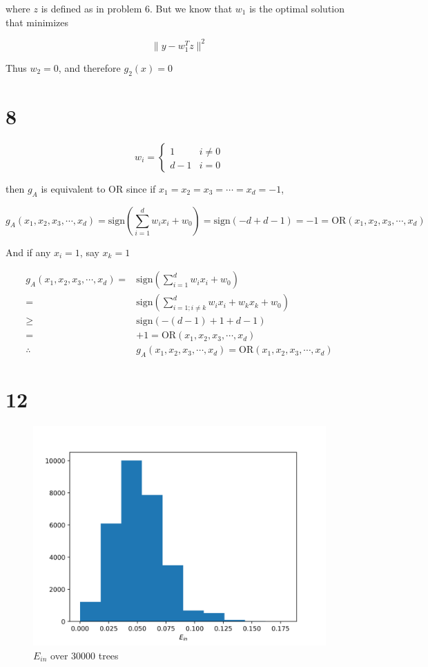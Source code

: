\documentclass[fleqn,a4paper,12pt]{article}
\begin{document}
where $z$ is defined as in problem 6. But we know that $w_1$ is the optimal solution that minimizes 

\begin{equation*}
  \lVert y - w_1^T z \rVert^2
\end{equation*}

Thus $w_2 = 0$, and therefore $g_2(x) = 0$

\section*{8}

\begin{equation*}
w_i =
\begin{cases}
  1 & i \ne 0 \\
  d - 1 & i = 0
\end{cases}
\end{equation*}

then $g_A$ is equivalent to OR since if $x_1 = x_2 = x_3 = \cdots = x_d = -1$,

\begin{equation*}
  g_A(x_1, x_2, x_3, \cdots, x_d) = \mathrm{sign}(\sum_{i=1}^d w_i x_i + w_0) = \mathrm{sign}(-d + d - 1) = -1 = \mathrm{OR}(x_1, x_2, x_3, \cdots, x_d)
\end{equation*}

And if any $x_i = 1$, say $x_k = 1$

\begin{align*}
  g_A(x_1, x_2, x_3, \cdots, x_d)
  =& \mathrm{sign}(\sum_{i=1}^d w_i x_i + w_0) \\
  =& \mathrm{sign}(\sum_{i=1; i \ne k}^d w_i x_i + w_k x_k + w_0) \\
  \geq& \mathrm{sign}(-(d - 1) + 1 + d - 1) \\
  =& +1 = \mathrm{OR}(x_1, x_2, x_3, \cdots, x_d) \\
  \therefore& g_A(x_1, x_2, x_3, \cdots, x_d) = \mathrm{OR}(x_1, x_2, x_3, \cdots, x_d)
\end{align*}


\section*{12}

\begin{figure}[H]
\centering
\includegraphics[width=0.75\linewidth]{hist-ein.png}
\caption{$E_{in}$ over 30000 trees}
\label{fig:hist-ein}
\end{figure}
\end{document}

